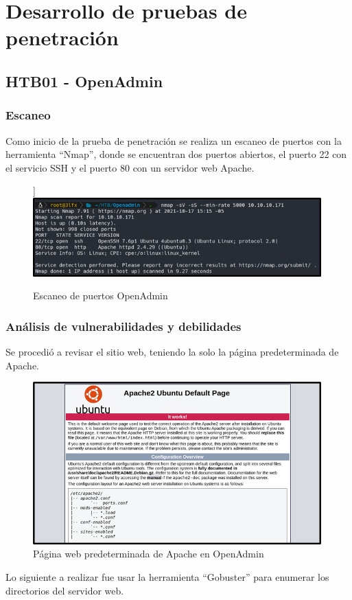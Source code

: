 \section{Desarrollo de pruebas de penetración}
\subsection{HTB01 - OpenAdmin}
\subsubsection{Escaneo}
Como inicio de la prueba de penetración se realiza un escaneo de puertos con la herramienta “Nmap”, donde se encuentran dos puertos abiertos, el puerto 22 con el servicio SSH y el puerto 80 con un servidor web Apache.
\begin{figure}[H]]
    \centering
    \includegraphics[width=0.99\textwidth]{imagenes/scanopen.png}
    \caption{Escaneo de puertos OpenAdmin}
\end{figure}
\subsubsection{Análisis de vulnerabilidades y debilidades}
Se procedió a revisar el sitio web, teniendo la solo la página predeterminada de Apache.
\begin{figure}[H]
    \centering
    \includegraphics[width=0.99\textwidth]{imagenes/apapred.png}
    \caption{Página web predeterminada de Apache en OpenAdmin}
\end{figure}
Lo siguiente a realizar fue usar la herramienta “Gobuster” para enumerar los directorios del servidor web.

